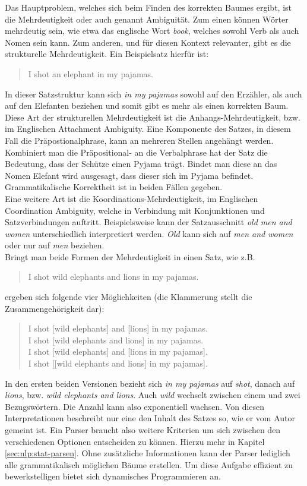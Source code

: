 Das Hauptproblem, welches sich beim Finden des korrekten Baumes ergibt, ist die Mehrdeutigkeit oder auch genannt Ambiguität. Zum einen können Wörter mehrdeutig sein, wie etwa das englische Wort \textit{book}, welches sowohl Verb als auch Nomen sein kann. Zum anderen, und für diesen Kontext relevanter, gibt es die strukturelle Mehrdeutigkeit. Ein Beispielsatz hierfür ist: 
\begin{quote}
I shot an elephant in my pajamas.
\end{quote}
In dieser Satzstruktur kann sich \textit{in my pajamas} sowohl auf den Erzähler, als auch auf den Elefanten beziehen und somit gibt es mehr als einen korrekten Baum. \\ 
Diese Art der strukturellen Mehrdeutigkeit ist die Anhangs-Mehrdeutigkeit, bzw. im Englischen Attachment Ambiguity. Eine Komponente des Satzes, in diesem Fall die Präpostionalphrase, kann an mehreren Stellen angehängt werden. Kombiniert man die Präpositional- an die Verbalphrase hat der Satz die Bedeutung, dass der Schütze einen Pyjama trägt. Bindet man diese an das Nomen Elefant wird ausgesagt, dass dieser sich im Pyjama befindet. Grammatikalische Korrektheit ist in beiden Fällen gegeben. \\
Eine weitere Art ist die Koordinations-Mehrdeutigkeit, im Englischen Coordination Ambiguity, welche in Verbindung mit Konjunktionen und Satzverbindungen auftritt. Beispielsweise kann der Satzausschnitt \textit{old men and women} unterschiedlich interpretiert werden. \textit{Old} kann sich auf \textit{men and women} oder nur auf \textit{men} beziehen. \\
Bringt man beide Formen der Mehrdeutigkeit in einen Satz, wie z.B. 
\begin{quote}
I shot wild elephants and lions in my pajamas.
\end{quote}
ergeben sich folgende vier Möglichkeiten (die Klammerung stellt die Zusammengehörigkeit dar): %
\begin{quote}
I shot [wild elephants] and [lions] in my pajamas.\\
I shot [wild elephants and lions] in my pajamas.\\
I shot [wild elephants] and [lions in my pajamas].\\
I shot [[wild elephants and lions] in my pajamas].\\
\end{quote}
In den ersten beiden Versionen bezieht sich \textit{in my pajamas} auf \textit{shot}, danach auf \textit{lions}, bzw. \textit{wild elephants and lions}. Auch \textit{wild} wechselt zwischen einem und zwei Bezugswörtern. Die Anzahl kann also exponentiell wachsen. %
Von diesen Interpretationen beschreibt nur eine den Inhalt des Satzes so, wie er vom Autor gemeint ist. Ein Parser braucht also weitere Kriterien um sich zwischen den verschiedenen Optionen entscheiden zu können. Hierzu mehr in Kapitel \ref{sec:nlp:stat-parsen}. Ohne zusätzliche Informationen kann der Parser lediglich alle grammatikalisch möglichen Bäume erstellen. Um diese Aufgabe effizient zu bewerkstelligen bietet sich dynamisches Programmieren an. 

